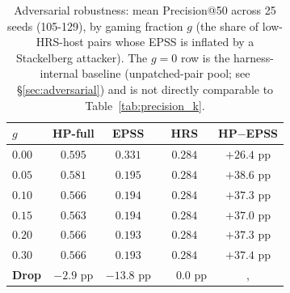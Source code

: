 \begin{table}[!t]
 \caption{Adversarial robustness: mean Precision@50 across 25
 seeds (105-129), by gaming fraction $g$ (the share of low-HRS-host
 pairs whose EPSS is inflated by a Stackelberg attacker). The $g=0$
 row is the harness-internal baseline (unpatched-pair pool; see
 \S\ref{sec:adversarial}) and is not directly comparable to
 Table~\ref{tab:precision_k}.}
 \label{tab:adversarial}
 \centering
 \small
 \setlength{\tabcolsep}{3pt}
 \begin{tabular}{@{}lccc c@{}}
 \toprule
 \textbf{$g$} & \textbf{HP-full} & \textbf{EPSS} &
 \textbf{HRS} & \textbf{HP$-$EPSS} \\
 \midrule
 $0.00$ & $0.595$ & $0.331$ & $0.284$ & $+26.4$ pp \\
 $0.05$ & $0.581$ & $0.195$ & $0.284$ & $+38.6$ pp \\
 $0.10$ & $0.566$ & $0.194$ & $0.284$ & $+37.3$ pp \\
 $0.15$ & $0.563$ & $0.194$ & $0.284$ & $+37.0$ pp \\
 $0.20$ & $0.566$ & $0.193$ & $0.284$ & $+37.3$ pp \\
 $0.30$ & $0.566$ & $0.193$ & $0.284$ & $+37.4$ pp \\
 \midrule
 \textbf{Drop} & $-2.9$ pp & $-13.8$ pp & $\phantom{+}0.0$ pp &, \\
 \bottomrule
 \end{tabular}
\end{table}
